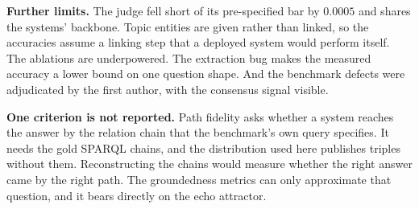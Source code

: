 \textbf{Further limits.} The judge fell short of its pre-specified bar by
$0.0005$ and shares the systems' backbone. Topic entities are given rather than
linked, so the accuracies assume a linking step that a deployed system would
perform itself. The ablations are underpowered. The extraction bug makes the
measured accuracy a lower bound on one question shape. And the benchmark defects
were adjudicated by the first author, with the consensus signal visible.

\textbf{One criterion is not reported.} Path fidelity asks whether a system
reaches the answer by the relation chain that the benchmark's own query
specifies. It needs the gold SPARQL chains, and the distribution used here
publishes triples without them. Reconstructing the chains would measure whether
the right answer came by the right path. The groundedness metrics can only
approximate that question, and it bears directly on the echo attractor.

\endinput
